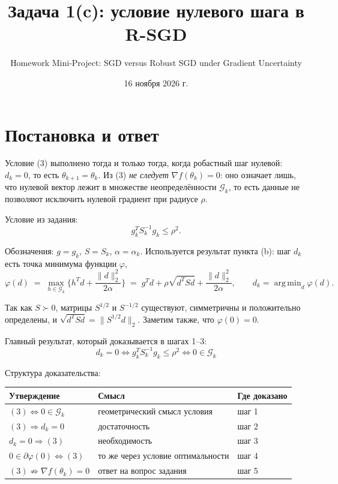 \documentclass[11pt,a4paper]{article}
\title{Задача 1(c): условие нулевого шага в R-SGD}
\author{Homework Mini-Project: SGD versus Robust SGD under Gradient Uncertainty}
\date{16 ноября 2026 г.}
\newcommand{\G}{\mathcal{G}_k}
\newcommand{\Shalf}{S^{1/2}}
\newcommand{\Smhalf}{S^{-1/2}}
\newcommand{\norm}[1]{\lVert #1\rVert_2}
\DeclareMathOperator*{\argmin}{arg\,min}
\begin{document}
\maketitle

\section*{Постановка и ответ}

Условие (3) выполнено тогда и только тогда, когда робастный шаг нулевой:
$d_k = 0$, то есть $\theta_{k+1} = \theta_k$. Из (3) \emph{не следует}
$\nabla f(\theta_k) = 0$: оно означает лишь, что нулевой вектор лежит в множестве
неопределённости $\G$, то есть данные не позволяют исключить нулевой градиент при
радиусе $\rho$.

Условие из задания:
\begin{equation*}
g_k^T S_k^{-1} g_k \le \rho^2. \tag{3}
\end{equation*}

Обозначения: $g = g_k$, $S = S_k$, $\alpha = \alpha_k$. Используется результат
пункта (b): шаг $d_k$ есть точка минимума функции $\varphi$,
\begin{equation*}
\varphi(d) \;=\; \max_{h\in\G}\Big\{h^Td + \frac{\norm{d}^2}{2\alpha}\Big\}
\;=\; g^Td + \rho\sqrt{d^TSd} + \frac{\norm{d}^2}{2\alpha},
\qquad d_k = \argmin_d \varphi(d).
\end{equation*}

Так как $S \succ 0$, матрицы $\Shalf$ и $\Smhalf$ существуют, симметричны и
положительно определены, и $\sqrt{d^TSd} = \norm{\Shalf d}$. Заметим также, что
$\varphi(0) = 0$.

Главный результат, который доказывается в шагах 1–3:
\begin{equation*}
\boxed{\; d_k = 0 \iff g_k^TS_k^{-1}g_k \le \rho^2 \iff 0\in\G \;}
\end{equation*}

Структура доказательства:

\begin{center}
\begin{tabular}{@{}lll@{}}
\toprule
Утверждение & Смысл & Где доказано \\
\midrule
$(3) \iff 0 \in \G$ & геометрический смысл условия & шаг 1 \\
$(3) \Rightarrow d_k = 0$ & достаточность & шаг 2 \\
$d_k = 0 \Rightarrow (3)$ & необходимость & шаг 3 \\
$0 \in \partial\varphi(0) \iff (3)$ & то же через условие оптимальности & шаг 4 \\
$(3) \not\Rightarrow \nabla f(\theta_k) = 0$ & ответ на вопрос задания & шаг 5 \\
\bottomrule
\end{tabular}
\end{center}
\end{document}
